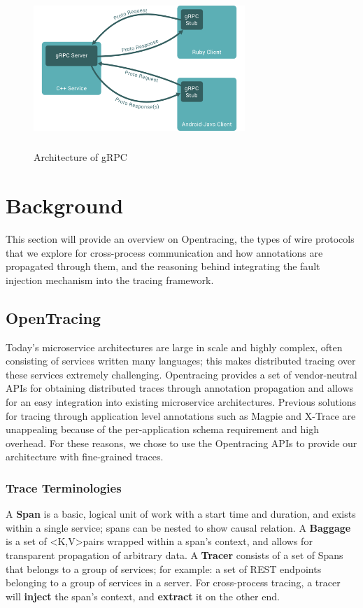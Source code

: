 \documentclass[letterpaper,twocolumn,10pt]{article}
\begin{document}
\begin{figure}
\centering
\includegraphics[width=8cm,height=6cm,keepaspectratio=true]{grpc_arch}
\caption{Architecture of gRPC}
\label{grpc_arch}
\end{figure}




\section{Background}
This section will provide an overview on Opentracing, the 
types of wire protocols that we explore for cross-process communication
and how annotations are propagated through them, and the reasoning behind 
integrating the fault injection mechanism into the tracing framework.


\subsection{OpenTracing}
Today's microservice architectures are large in scale and highly complex, often consisting 
of services written many languages; this makes distributed tracing over these services
extremely challenging. Opentracing\cite{opentracing:doc} provides a set of vendor-neutral
APIs for obtaining distributed traces through annotation propagation and allows for an easy
integration into existing microservice architectures. Previous solutions for tracing through
application level annotations such as Magpie\cite{magpie} and X-Trace\cite{xtrace} are unappealing
because of the per-application schema requirement and high overhead\cite{sigelman:dapper}. For these reasons,
we chose to use the Opentracing APIs to provide our architecture with fine-grained traces. 



\subsubsection{Trace Terminologies}
A \textbf{Span} is a basic, logical unit of work with a start time and duration, and exists within 
a single service; spans can be nested to show causal relation. A \textbf{Baggage} is a set of \textless K,V\textgreater pairs wrapped within a span's context, and allows for transparent propagation of arbitrary data. A \textbf{Tracer} consists of a set of Spans that belongs to a group of services; for example: a set of REST endpoints belonging to a group of services in a server. For cross-process tracing, a tracer will \textbf{inject} the span's context, and \textbf{extract} it on the other end.
\end{document}
